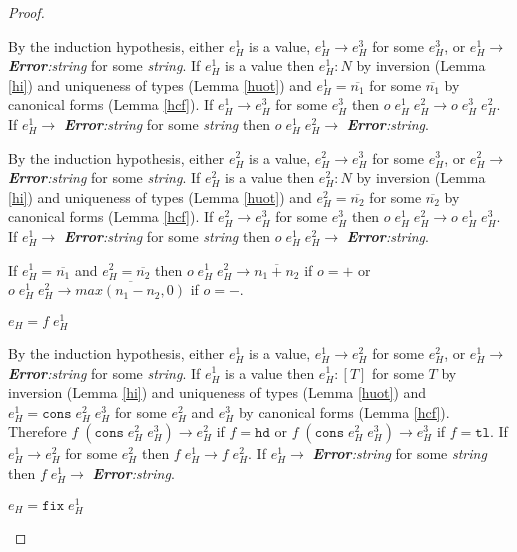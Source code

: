 \begin{hps}
\begin{proof}
\begin{hps-case-10}
By the induction hypothesis, either $e_{H}^{1}$ is a value, $e_{H}^{1}\rightarrow e_{H}^{3}$ for some $e_{H}^{3}$, or $e_{H}^{1}\rightarrow$ \emph{\textbf{Error}:\;string} for some \emph{string}.  If $e_{H}^{1}$ is a value then $e_{H}^{1}:N$ by inversion (Lemma \ref{hi}) and uniqueness of types (Lemma \ref{huot}) and $e_{H}^{1}=\overline{n_{1}}$ for some $\overline{n_{1}}$ by canonical forms (Lemma \ref{hcf}).  If $e_{H}^{1}\rightarrow e_{H}^{3}$ for some $e_{H}^{3}$ then $o\;e_{H}^{1}\;e_{H}^{2}\rightarrow o\;e_{H}^{3}\;e_{H}^{2}$.  If $e_{H}^{1}\rightarrow$ \emph{\textbf{Error}:\;string} for some \emph{string} then $o\;e_{H}^{1}\;e_{H}^{2}\rightarrow$ \emph{\textbf{Error}:\;string}.

By the induction hypothesis, either $e_{H}^{2}$ is a value, $e_{H}^{2}\rightarrow e_{H}^{3}$ for some $e_{H}^{3}$, or $e_{H}^{2}\rightarrow$ \emph{\textbf{Error}:\;string} for some \emph{string}.  If $e_{H}^{2}$ is a value then $e_{H}^{2}:N$ by inversion (Lemma \ref{hi}) and uniqueness of types (Lemma \ref{huot}) and $e_{H}^{2}=\overline{n_{2}}$ for some $\overline{n_{2}}$ by canonical forms (Lemma \ref{hcf}).  If $e_{H}^{2}\rightarrow e_{H}^{3}$ for some $e_{H}^{3}$ then $o\;e_{H}^{1}\;e_{H}^{2}\rightarrow o\;e_{H}^{1}\;e_{H}^{3}$.  If $e_{H}^{1}\rightarrow$ \emph{\textbf{Error}:\;string} for some \emph{string} then $o\;e_{H}^{1}\;e_{H}^{2}\rightarrow$ \emph{\textbf{Error}:\;string}.

If $e_{H}^{1}=\overline{n_{1}}$ and $e_{H}^{2}=\overline{n_{2}}$ then $o\;e_{H}^{1}\;e_{H}^{2}\rightarrow \overline{n_{1}+n_{2}}$ if $o=+$ or $o\;e_{H}^{1}\;e_{H}^{2}\rightarrow \overline{max(n_{1}-n_{2},0)}$ if $o=-$.
\end{hps-case-10}
\begin{hps-case-11}
$e_{H}=f\;e_{H}^{1}$

By the induction hypothesis, either $e_{H}^{1}$ is a value, $e_{H}^{1}\rightarrow e_{H}^{2}$ for some $e_{H}^{2}$, or $e_{H}^{1}\rightarrow$ \emph{\textbf{Error}:\;string} for some \emph{string}.  If $e_{H}^{1}$ is a value then $e_{H}^{1}:[T]$ for some $T$ by inversion (Lemma \ref{hi}) and uniqueness of types (Lemma \ref{huot}) and $e_{H}^{1}=\mathtt{cons}\;e_{H}^{2}\;e_{H}^{3}$ for some $e_{H}^{2}$ and $e_{H}^{3}$ by canonical forms (Lemma \ref{hcf}).  Therefore $f\;(\mathtt{cons}\;e_{H}^{2}\;e_{H}^{3})\rightarrow e_{H}^{2}$ if $f=\mathtt{hd}$ or $f\;(\mathtt{cons}\;e_{H}^{2}\;e_{H}^{3})\rightarrow e_{H}^{3}$ if $f=\mathtt{tl}$.  If $e_{H}^{1}\rightarrow e_{H}^{2}$ for some $e_{H}^{2}$ then $f\;e_{H}^{1}\rightarrow f\;e_{H}^{2}$.  If $e_{H}^{1}\rightarrow$ \emph{\textbf{Error}:\;string} for some \emph{string} then $f\;e_{H}^{1}\rightarrow$ \emph{\textbf{Error}:\;string}.
\end{hps-case-11}
\begin{hps-case-12}
$e_{H}=\mathtt{fix}\;e_{H}^{1}$


\end{hps-case-12}
\end{proof}
\end{hps}
